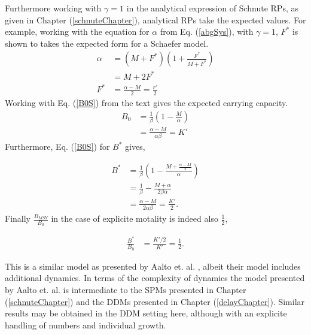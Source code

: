 %
Furthermore working with $\gamma=1$ in the analytical expression of Schnute RPs, 
as given in Chapter (\ref{schnuteChapter}), analytical RPs take the expected 
values. For example, working with the equation for $\alpha$ from Eq. (\ref{abgSys}), 
with $\gamma=1$, $F^*$ is shown to takes the expected form for a Schaefer model.
\begin{align}
\alpha &= (M+F^*)\left(1+\frac{F^*}{M+F^*}\right) \nonumber\\
       &= M+2F^* \nonumber\\
   F^* &= \frac{\alpha-M}{2} = \frac{r'}{2} 
\end{align}
Working with Eq. (\ref{B0S}) from the text gives the expected carrying capacity.
\begin{align}
B_0 &= \frac{1}{\beta} \left( 1-\frac{M}{\alpha} \right) \nonumber\\
    &= \frac{\alpha-M}{\alpha\beta} = K'
\end{align}
Furthermore, Eq. (\ref{B0S}) for $B^*$ gives,

\begin{align}
    B^* &= \frac{1}{\beta} \left( 1-\frac{M+\frac{\alpha-M}{2}}{\alpha}\right) \nonumber\\
        &= \frac{1}{\beta} - \frac{M+\alpha}{2\beta\alpha}\nonumber\\
        &= \frac{\alpha-M}{2\alpha\beta} = \frac{K'}{2}.
\end{align}
%
Finally $\frac{B_{MSY}}{B_0}$ in the case of explicite motality is indeed also $\frac{1}{2}$,

\begin{align}
\frac{B^*}{B_0}&=\frac{K'/2}{K'}=\frac{1}{2}.
\end{align}

%
This is a similar model as presented by Aalto et. al. \cite{aalto_separating_2015}, 
albeit their model includes additional dynamics. In terms of the complexity of 
dynamics the model presented by Aalto et. al. is intermediate to the SPMs 
presented in Chapter (\ref{schnuteChapter}) and the DDMs presented in 
Chapter (\ref{delayChapter}). Similar results may be obtained in the DDM 
setting here, although with an explicite handling of numbers and individual 
growth.  
